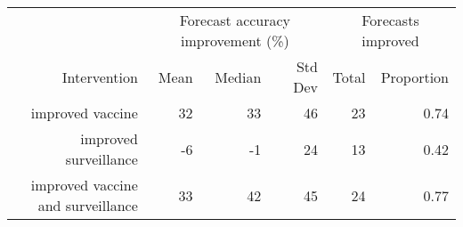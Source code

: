 
\begin{tabular*}{1.0\textwidth}{rrrrrr}
\toprule
             & \multicolumn{3}{c}{Forecast accuracy improvement (\%)} & \multicolumn{2}{c}{Forecasts improved} \\
Intervention & Mean & Median & Std Dev & Total & Proportion \\
\midrule

improved vaccine & 32 & 33 & 46 & 23 & 0.74 \\
improved surveillance & -6 & -1 & 24 & 13 & 0.42 \\
improved vaccine and surveillance & 33 & 42 & 45 & 24 & 0.77 \\

\bottomrule
\end{tabular*}

